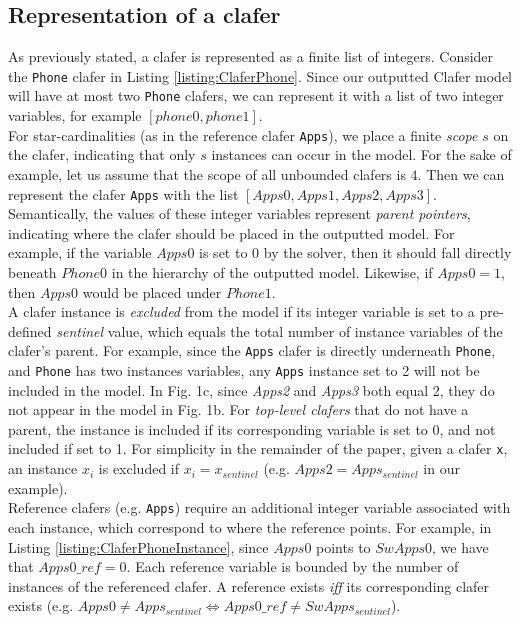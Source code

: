 \documentclass{article}
\begin{document}
\subsection{Representation of a clafer}
As previously stated, a clafer is represented as a finite list of integers. Consider the \texttt{Phone} clafer in Listing \ref{listing:ClaferPhone}. Since our outputted Clafer model will have at most two \texttt{Phone} clafers, we can represent it with a list of two integer variables, for example $[phone0, phone1]$.  \\
\indent For star-cardinalities (as in the reference clafer \texttt{Apps}), we place a finite \textit{scope} $s$ on the clafer, indicating that only $s$ instances can occur in the model. For the sake of example, let us assume that the scope of all unbounded clafers is $4$. Then we can represent the clafer \texttt{Apps} with the list $[Apps0, Apps1, Apps2, Apps3]$.\\
\indent Semantically, the values of these integer variables represent \textit{parent pointers}, indicating where the clafer should be placed in the outputted model. For example, if the variable $Apps0$ is set to $0$ by the solver, then it should fall directly beneath $Phone0$ in the hierarchy of the outputted model. Likewise, if $Apps0 = 1$, then $Apps0$ would be placed under $Phone1$.\\
\indent A clafer instance is \textit{excluded} from the model if its integer variable is set to a pre-defined \textit{sentinel} value, which equals the total number of instance variables of the clafer's parent. For example, since the \texttt{Apps} clafer is directly underneath \texttt{Phone}, and \texttt{Phone} has two instances variables, any \texttt{Apps} instance set to 2 will not be included in the model. In Fig. 1c, since \textit{Apps2} and \textit{Apps3} both equal 2, they do not appear in the model in Fig. 1b. For \textit{top-level clafers} that do not have a parent, the instance is included if its corresponding variable is set to 0, and not included if set to 1. For simplicity in the remainder of the paper, given a clafer \texttt{x}, an instance \textit{$x_i$} is excluded if  $x_i = x_{sentinel}$ (e.g. $Apps2 = Apps_{sentinel}$ in our example). \\
\indent Reference clafers (e.g. \texttt{Apps}) require an additional integer variable associated with each instance, which correspond to where the reference points. For example, in Listing \ref{listing:ClaferPhoneInstance}, since $Apps0$ points to $SwApps0$, we have that $Apps0\_ref = 0$. Each reference variable is bounded by the number of instances of the referenced clafer. A reference exists \textit{iff} its corresponding clafer exists (e.g. $Apps0 \ne Apps_{sentinel} \Leftrightarrow Apps0\_ref \ne SwApps_{sentinel}$). \\
\end{document}
